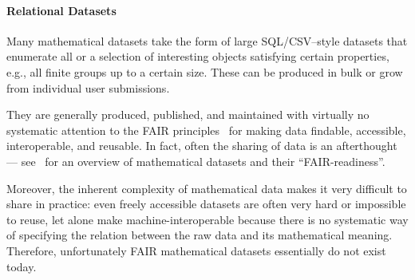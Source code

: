\paragraph{Relational Datasets}
Many mathematical datasets take the form of large SQL/CSV--style datasets that enumerate all or a selection of interesting objects satisfying certain properties, e.g., all finite groups up to a certain size.
These can be produced in bulk or grow from individual user submissions.

They are generally produced, published, and maintained with virtually no systematic attention to the FAIR principles~\cite{FAIR,WilDumAal:FAIR16} for making data findable, accessible, interoperable, and reusable.
In fact, often the sharing of data is an afterthought --- see~\cite{Bercic:cmo:wiki} for an overview of mathematical datasets and their ``FAIR-readiness''.

Moreover, the inherent complexity of mathematical data makes it very difficult to share in practice: even freely accessible datasets are often very hard or impossible to reuse, let alone make machine-interoperable because there is no systematic way of specifying the relation between the raw data and its mathematical meaning. 
Therefore, unfortunately FAIR mathematical datasets essentially do not exist today.


